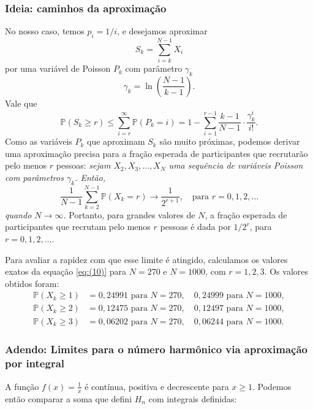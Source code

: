 \documentclass[a4paper,12pt]{article}
\begin{document}
\subsubsection*{Ideia: caminhos da aproximação}
No nosso caso, temos $p_i = 1/i$, e desejamos aproximar
\begin{equation}
  {S}_{k}  = \sum_{i=k}^{N-1} X_i
\end{equation}
por uma variável de Poisson $P_k$ com parâmetro $\gamma_k$
\begin{equation}
  \gamma_k = \ln \left( \frac{N-1}{k-1} \right).
\end{equation}
Vale que
\[
  \mathbb P(S_k\geq r) \leq \sum_{i=r}^\infty \mathbb P (P_k =i)
  =1-\sum_{i=1}^{ r-1}\frac{k-1}{N-1}\cdot\frac{\gamma_k^i}{i!}.
\]
Como as variáveis $P_k$ que aproximam $S_k$ são muito próximas, podemos
derivar uma aproximação precisa para a fração esperada de participantes
que recrutarão pelo menos $r$ pessoas: \emph{sejam
  $X_2, X_3, \dots, X_N$ uma sequência de variáveis Poisson com
  parâmetros $\gamma_k$. Então,}
\begin{equation}\label{eq:(10)}
  \frac{1}{N-1} \sum_{k=2}^{N-1} \mathbb P(X_k = r) \to \frac{1}{2^{r+1}}, \quad \text{para } r = 0, 1, 2, \dots
\end{equation}
\emph{quando $N \to \infty$.} Portanto, para grandes valores de $N$, a
fração esperada de participantes que recrutam pelo menos $r$ pessoas é
dada por $1/2^r$, para $r = 0, 1, 2, \dots$.

Para avaliar a rapidez com que esse limite é atingido, calculamos os
valores exatos da equação \eqref{eq:(10)} para $N = 270$ e $N = 1000$,
com $r = 1, 2, 3$. Os valores obtidos foram:
\begin{align*}
   \mathbb P(X_k \geq 1) &= 0,24991 \text{ para } N = 270, \quad 0,24999 \text{ para } N = 1000, \\
  \mathbb  P(X_k \geq 2) &= 0,12475 \text{ para } N = 270, \quad 0,12497 \text{ para } N = 1000, \\
  \mathbb  P(X_k \geq 3) &= 0,06202 \text{ para } N = 270, \quad 0,06244 \text{ para } N = 1000.
\end{align*}


\subsubsection*{Adendo: Limites para o número harmônico via aproximação
  por integral}


A função \( f(x) = \frac{1}{x} \) é contínua, positiva e decrescente
para \( x \geq 1 \). Podemos então comparar a soma que defini $H_n$ com
integrais definidas:
\end{document}
